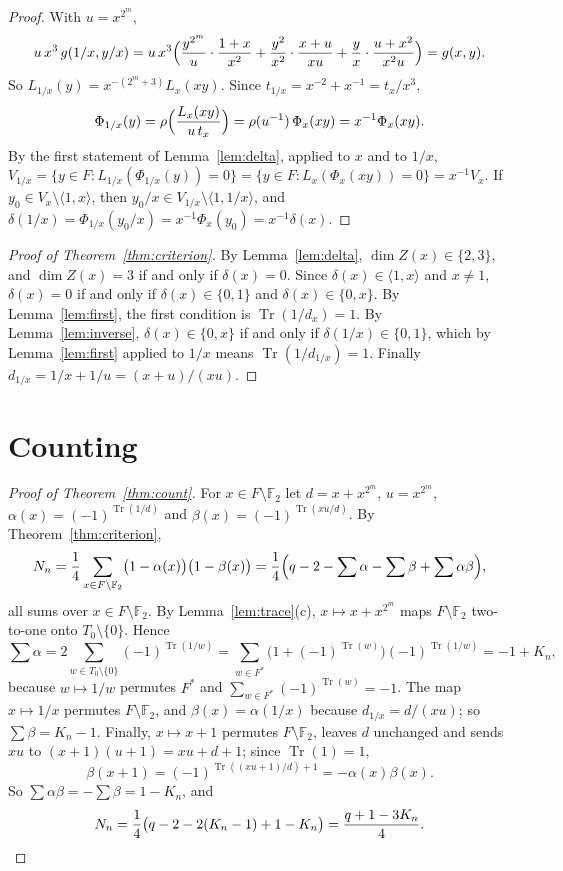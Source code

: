 \documentclass[11pt]{amsart}
\theoremstyle{definition}
\theoremstyle{remark}
\numberwithin{equation}{section}
\newcommand{\F}{\mathbb{F}}
\newcommand{\Tr}{\operatorname{Tr}}
\begin{document}
\begin{proof}
With $u=x^{2^m}$,
\[
u\,x^3\,g(1/x,y/x)=u\,x^3\Bigl(\frac{y^{2^m}}{u}\cdot\frac{1+x}{x^2}+\frac{y^2}{x^2}\cdot\frac{x+u}{xu}+\frac yx\cdot\frac{u+x^2}{x^2u}\Bigr)=g(x,y).
\]
So $L_{1/x}(y)=x^{-(2^m+3)}L_x(xy)$. Since $t_{1/x}=x^{-2}+x^{-1}=t_x/x^3$,
\[
\Phi_{1/x}(y)=\rho\Bigl(\frac{L_x(xy)}{u\,t_x}\Bigr)=\rho(u^{-1})\,\Phi_x(xy)=x^{-1}\Phi_x(xy).
\]
By the first statement of Lemma~\ref{lem:delta}, applied to $x$ and to $1/x$, $V_{1/x}=\{y\in F:L_{1/x}(\Phi_{1/x}(y))=0\}=\{y\in F:L_x(\Phi_x(xy))=0\}=x^{-1}V_x$. If $y_0\in V_x\setminus\langle1,x\rangle$, then $y_0/x\in V_{1/x}\setminus\langle1,1/x\rangle$, and $\delta(1/x)=\Phi_{1/x}(y_0/x)=x^{-1}\Phi_x(y_0)=x^{-1}\delta(x)$.
\end{proof}

\begin{proof}[Proof of Theorem~\ref{thm:criterion}]
By Lemma~\ref{lem:delta}, $\dim Z(x)\in\{2,3\}$, and $\dim Z(x)=3$ if and only if $\delta(x)=0$. Since $\delta(x)\in\langle1,x\rangle$ and $x\ne1$, $\delta(x)=0$ if and only if $\delta(x)\in\{0,1\}$ and $\delta(x)\in\{0,x\}$. By Lemma~\ref{lem:first}, the first condition is $\Tr(1/d_x)=1$. By Lemma~\ref{lem:inverse}, $\delta(x)\in\{0,x\}$ if and only if $\delta(1/x)\in\{0,1\}$, which by Lemma~\ref{lem:first} applied to $1/x$ means $\Tr(1/d_{1/x})=1$. Finally $d_{1/x}=1/x+1/u=(x+u)/(xu)$.
\end{proof}

\section{Counting}\label{sec:count}

\begin{proof}[Proof of Theorem~\ref{thm:count}]
For $x\in F\setminus\F_2$ let $d=x+x^{2^m}$, $u=x^{2^m}$, $\alpha(x)=(-1)^{\Tr(1/d)}$ and $\beta(x)=(-1)^{\Tr(xu/d)}$. By Theorem~\ref{thm:criterion},
\[
N_n=\frac14\sum_{x\in F\setminus\F_2}\bigl(1-\alpha(x)\bigr)\bigl(1-\beta(x)\bigr)=\frac14\Bigl(q-2-\sum\alpha-\sum\beta+\sum\alpha\beta\Bigr),
\]
all sums over $x\in F\setminus\F_2$. By Lemma~\ref{lem:trace}(c), $x\mapsto x+x^{2^m}$ maps $F\setminus\F_2$ two-to-one onto $T_0\setminus\{0\}$. Hence
\[
\sum\alpha=2\sum_{w\in T_0\setminus\{0\}}(-1)^{\Tr(1/w)}=\sum_{w\in F^*}\bigl(1+(-1)^{\Tr(w)}\bigr)(-1)^{\Tr(1/w)}=-1+K_n ,
\]
because $w\mapsto1/w$ permutes $F^*$ and $\sum_{w\in F^*}(-1)^{\Tr(w)}=-1$. The map $x\mapsto1/x$ permutes $F\setminus\F_2$, and $\beta(x)=\alpha(1/x)$ because $d_{1/x}=d/(xu)$; so $\sum\beta=K_n-1$. Finally, $x\mapsto x+1$ permutes $F\setminus\F_2$, leaves $d$ unchanged and sends $xu$ to $(x+1)(u+1)=xu+d+1$; since $\Tr(1)=1$,
\[
\beta(x+1)=(-1)^{\Tr((xu+1)/d)+1}=-\alpha(x)\beta(x).
\]
So $\sum\alpha\beta=-\sum\beta=1-K_n$, and
\[
N_n=\frac14\bigl(q-2-2(K_n-1)+1-K_n\bigr)=\frac{q+1-3K_n}{4}. \qedhere
\]
\end{proof}
\end{document}
